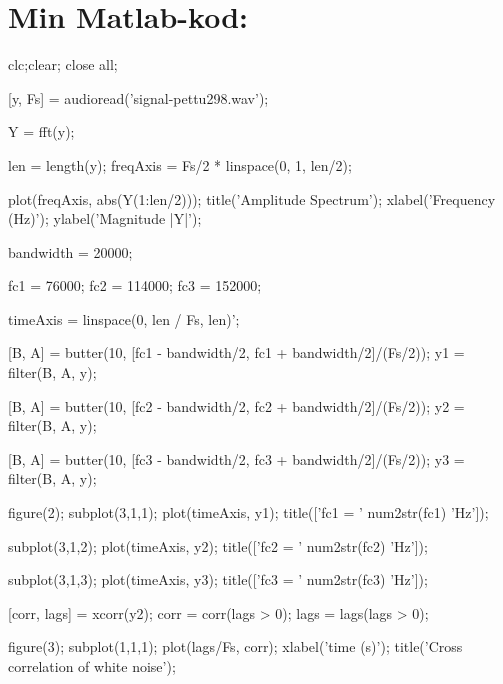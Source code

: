 \documentclass[10pt,twocolumn]{article}
\begin{document}
\onecolumn
\clearpage

\section*{Min Matlab-kod:}

\begin{spverbatim}

clc;clear; close all;

[y, Fs] = audioread('signal-pettu298.wav');

Y = fft(y);

len = length(y);
freqAxis = Fs/2 * linspace(0, 1, len/2);


plot(freqAxis, abs(Y(1:len/2)));
title('Amplitude Spectrum');
xlabel('Frequency (Hz)');
ylabel('Magnitude |Y|');

bandwidth = 20000;     %
   
fc1 = 76000;
fc2 = 114000;
fc3 = 152000;

timeAxis = linspace(0, len / Fs, len)';    

[B, A] = butter(10, [fc1 - bandwidth/2, fc1 + bandwidth/2]/(Fs/2));
y1 = filter(B, A, y);

[B, A] = butter(10, [fc2 - bandwidth/2, fc2 + bandwidth/2]/(Fs/2));
y2 = filter(B, A, y);

[B, A] = butter(10, [fc3 - bandwidth/2, fc3 + bandwidth/2]/(Fs/2));
y3 = filter(B, A, y);

figure(2);
subplot(3,1,1);
plot(timeAxis, y1);
title(['fc1 = ' num2str(fc1) 'Hz']);

subplot(3,1,2);
plot(timeAxis, y2);
title(['fc2 = ' num2str(fc2) 'Hz']);

subplot(3,1,3);
plot(timeAxis, y3);
title(['fc3 = ' num2str(fc3) 'Hz']);


[corr, lags] = xcorr(y2);
corr = corr(lags > 0); %
lags = lags(lags > 0);

figure(3);
subplot(1,1,1);
plot(lags/Fs, corr);
xlabel('time (s)');
title('Cross correlation of white noise');


\end{spverbatim}
\end{document}
